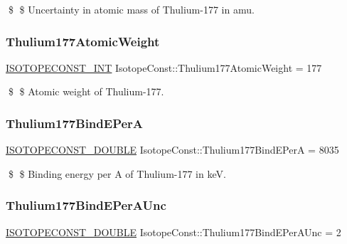 \$ \$ Uncertainty in atomic mass of Thulium-\/177 in amu. \mbox{\label{group___isotope_const-_thulium-_tm177_gab28f3a753b3fb1e0c1f465c4dab7c9b6}} 
\subsubsection{\texorpdfstring{Thulium177\+Atomic\+Weight}{Thulium177AtomicWeight}}
{\footnotesize\ttfamily \mbox{\hyperlink{group___isotope_const-_macros_ga5f18360b3e99483a35c32d789e62621c}{I\+S\+O\+T\+O\+P\+E\+C\+O\+N\+S\+T\+\_\+\+I\+NT}} Isotope\+Const\+::\+Thulium177\+Atomic\+Weight = 177}

\$ \$ Atomic weight of Thulium-\/177. \mbox{\label{group___isotope_const-_thulium-_tm177_ga711377f2165b38c971437aaaed4df1df}} 
\subsubsection{\texorpdfstring{Thulium177\+Bind\+E\+PerA}{Thulium177BindEPerA}}
{\footnotesize\ttfamily \mbox{\hyperlink{group___isotope_const-_macros_ga8f45a7272ce02c0b4c65c44636ed719a}{I\+S\+O\+T\+O\+P\+E\+C\+O\+N\+S\+T\+\_\+\+D\+O\+U\+B\+LE}} Isotope\+Const\+::\+Thulium177\+Bind\+E\+PerA = 8035}

\$ \$ Binding energy per A of Thulium-\/177 in keV. \mbox{\label{group___isotope_const-_thulium-_tm177_ga75b636468e6ed24fe4cdab0009813375}} 
\subsubsection{\texorpdfstring{Thulium177\+Bind\+E\+Per\+A\+Unc}{Thulium177BindEPerAUnc}}
{\footnotesize\ttfamily \mbox{\hyperlink{group___isotope_const-_macros_ga8f45a7272ce02c0b4c65c44636ed719a}{I\+S\+O\+T\+O\+P\+E\+C\+O\+N\+S\+T\+\_\+\+D\+O\+U\+B\+LE}} Isotope\+Const\+::\+Thulium177\+Bind\+E\+Per\+A\+Unc = 2}

